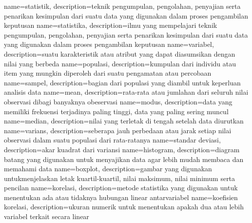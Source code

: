 \makeglossaries

{
	name={statistik},
	description={teknik pengumpulan, pengolahan, penyajian serta penarikan kesimpulan dari suatu data yang digunakan dalam proses pengambilan keputusan}
}
{
	name={statistika},
	description={ilmu yang mempelajari teknik pengumpulan, pengolahan, penyajian serta penarikan kesimpulan dari suatu data yang digunakan dalam proses pengambilan keputusan}
}
{
	name={variabel},
	description={suatu karakteristik atau atribut yang dapat diasumsikan dengan nilai yang berbeda}
}
{
	name={populasi},
	description={kumpulan dari individu atau item yang mungkin diperoleh dari suatu pengamatan atau percobaan}
}
{
	name={sampel},
	description={bagian dari populasi yang diambil untuk keperluan analisis data}
}
{
	name={mean},
	description={rata-rata atau jumlahan dari seluruh nilai observasi dibagi banyaknya obeservasi}
}
{
	name={modus},
	description={data yang memiliki frekuensi terjadinya paling tinggi, data yang paling sering muncul}
}
{
	name={median},
	description={nilai yang terletak di tengah setelah data diurutkan}
}
{
	name={varians},
	description={seberapa jauh perbedaan atau jarak setiap nilai observasi dalam suatu populasi dari rata-ratanya}
}
{
	name={standar deviasi},
	description={akar kuadrat dari variansi}
}
{
	name={histogram},
	description={diagram batang yang digunakan untuk menyajikan data agar lebih mudah membaca dan memahami data}
}
{
	name={boxplot},
	description={gambar yang digunakan untukmenjelaskan letak kuartil-kuartil, nilai maksimum, nilai minimum serta pencilan}
}
{
	name={korelasi},
	description={metode statistika yang digunakan untuk menentukan ada atau tidaknya hubungan linear antarvariabel}
}
{
	name={koefisien korelasi},
	description={ukuran numerik untuk menentukan apakah dua atau lebih variabel terkait secara linear}
}